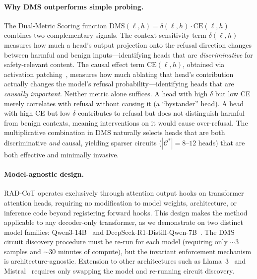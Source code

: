 \documentclass[11pt]{article}
\begin{document}
\paragraph{Why DMS outperforms simple probing.}
The Dual-Metric Scoring function $\mathrm{DMS}(\ell, h) = \delta(\ell, h) \cdot \mathrm{CE}(\ell, h)$ combines two complementary signals. The context sensitivity term $\delta(\ell, h)$ measures how much a head's output projection onto the refusal direction changes between harmful and benign inputs---identifying heads that are \emph{discriminative} for safety-relevant content. The causal effect term $\mathrm{CE}(\ell, h)$, obtained via activation patching~\citep{nanda2023attribution, goldowsky2023localizing}, measures how much ablating that head's contribution actually changes the model's refusal probability---identifying heads that are \emph{causally important}. Neither metric alone suffices. A head with high $\delta$ but low CE merely correlates with refusal without causing it (a ``bystander'' head). A head with high CE but low $\delta$ contributes to refusal but does not distinguish harmful from benign contexts, meaning interventions on it would cause over-refusal. The multiplicative combination in DMS naturally selects heads that are both discriminative \emph{and} causal, yielding sparser circuits ($|\mathcal{C}^*| = 8$--$12$ heads) that are both effective and minimally invasive.

\paragraph{Model-agnostic design.}
RAD-CoT operates exclusively through attention output hooks on transformer attention heads, requiring no modification to model weights, architecture, or inference code beyond registering forward hooks. This design makes the method applicable to any decoder-only transformer, as we demonstrate on two distinct model families: Qwen3-14B~\citep{qwen2025qwen3} and DeepSeek-R1-Distill-Qwen-7B~\citep{deepseek2025r1}. The DMS circuit discovery procedure must be re-run for each model (requiring only $\sim$3 samples and $\sim$30 minutes of compute), but the invariant enforcement mechanism is architecture-agnostic. Extension to other architectures such as Llama~3~\citep{meta2024llama3} and Mistral~\citep{jiang2023mistral} requires only swapping the model and re-running circuit discovery.
\end{document}

